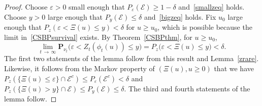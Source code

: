 \documentclass[10pt]{amsart}
\theoremstyle{definition}\newtheorem{defi}[theo]{Definition}\newtheorem{rema}[theo]{Remark}\newtheorem{exam}[theo]{Example}\newtheorem{exem}[theo]{Example}\newtheorem{nota}[theo]{Notation}
\newcommand*\eps{\varepsilon}
\renewcommand*\P{\mathbf{P}}
\newcommand{\clE}{\mathcal{E}}
\newcommand{\1} {\mathds{1}}
\begin{document}
\begin{proof}
Choose $\eps > 0$ small enough that $P_{\eps}(\clE) \geq 1 - \delta$ and~\eqref{smallzeq} holds. Choose $y > 0$ large enough that $P_y(\clE) \leq \delta$ and~\eqref{bigzeq} holds. Fix $u_0$ large enough that $P_z(\eps < \Xi(u) \leq y) < \delta$ for $u \geq u_0$, which is possible because the limit in~\eqref{CSBPsurvival} exists. By Theorem~\ref{CSBPthm}, for $u \geq u_0$,
\[
\lim_{t\,\rightarrow\,\infty} \P_{\nu_t}\big(\eps < Z_t(\phi_t(u)) \leq y\big) = P_z\big(\eps < \Xi(u) \leq y\big) < \delta.
\]
The first two statements of the lemma follow from this result and Lemma~\ref{zrare}. Likewise, it follows from the Markov property of $(\Xi(u), u \geq 0)$ that we have $P_z(\{\Xi(u) \leq \eps\} \cap \clE^c) \leq P_{\eps}(\clE^c) < \delta$ and $P_z(\{\Xi(u) > y\} \cap \clE) \leq P_y(\clE) \leq \delta$. The third and fourth statements of the lemma follow.
\end{proof}
\end{document}
